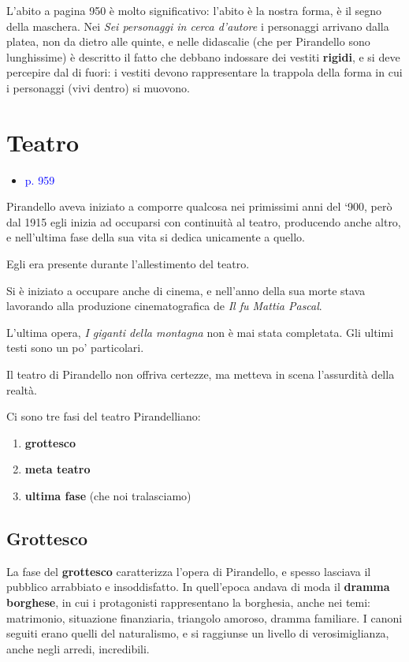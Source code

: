 \documentclass[a4paper, twoside, titlepage]{book}
\newcommand{\elenco}[1]{%
\begin{itemize}
#1
\end{itemize}}
\renewcommand{\emph}[1]{\textcolor{blue}{#1}}
\begin{document}
L’abito a pagina 950 è molto significativo: l’abito è la nostra forma, è il segno della maschera. 
Nei \textit{Sei personaggi in cerca d’autore} i personaggi arrivano dalla platea, non da dietro alle quinte, e nelle didascalie (che per Pirandello sono lunghissime) è descritto il fatto che debbano indossare dei vestiti \textbf{rigidi}, e si deve percepire dal di fuori: i vestiti devono rappresentare la trappola della forma in cui i personaggi (vivi dentro) si muovono.


\chapter{Teatro}
\elenco{\item \emph{p. 959}}

Pirandello aveva iniziato a comporre qualcosa nei primissimi anni del ‘900, però dal 1915 egli inizia ad occuparsi con continuità al teatro, producendo anche altro, e nell’ultima fase della sua vita si dedica unicamente a quello.

Egli era presente durante l’allestimento del teatro.

Si è iniziato a occupare anche di cinema, e nell’anno della sua morte stava lavorando alla produzione cinematografica de \textit{Il fu Mattia Pascal}.

L’ultima opera, \textit{I giganti della montagna} non è mai stata completata.
Gli ultimi testi sono un po’ particolari.

Il teatro di Pirandello non offriva certezze, ma metteva in scena l’assurdità della realtà.

Ci sono tre fasi del teatro Pirandelliano:
\begin{enumerate}
\item \textbf{grottesco}
\item \textbf{meta teatro}
\item \textbf{ultima fase} (che noi tralasciamo)
\end{enumerate}

\section{Grottesco}

La fase del \textbf{grottesco} caratterizza l’opera di Pirandello, e spesso lasciava il pubblico arrabbiato e insoddisfatto. 
In quell’epoca andava di moda il \textbf{dramma borghese}, in cui i protagonisti rappresentano la borghesia, anche nei temi: matrimonio, situazione finanziaria, triangolo amoroso, dramma familiare. I canoni seguiti erano quelli del naturalismo, e si raggiunse un livello di verosimiglianza, anche negli arredi, incredibili.
\end{document}
